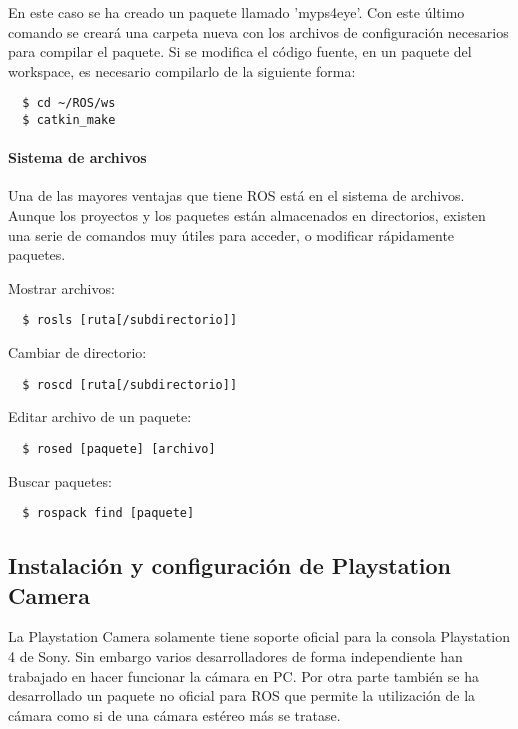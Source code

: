 En este caso se ha creado un paquete llamado 'myps4eye'. Con este último comando
se creará una carpeta nueva con los archivos de configuración necesarios para
compilar el paquete. Si se modifica el código fuente, en un paquete del
workspace, es necesario compilarlo de la siguiente forma:
\\
\begin{lstlisting}
  $ cd ~/ROS/ws
  $ catkin_make
\end{lstlisting}

\paragraph{Sistema de archivos} \hspace{0pt}

Una de las mayores ventajas que tiene ROS está en el sistema de archivos. Aunque
los proyectos y los paquetes están almacenados en directorios, existen una serie
de comandos muy útiles para acceder, o modificar rápidamente paquetes.

Mostrar archivos:
\\
\begin{lstlisting}
  $ rosls [ruta[/subdirectorio]]
\end{lstlisting}

Cambiar de directorio:
\\
\begin{lstlisting}
  $ roscd [ruta[/subdirectorio]]
\end{lstlisting}

Editar archivo de un paquete:
\\
\begin{lstlisting}
  $ rosed [paquete] [archivo]
\end{lstlisting}

Buscar paquetes:
\\
\begin{lstlisting}
  $ rospack find [paquete]
\end{lstlisting}


\subsection{Instalación y configuración de Playstation Camera}

La Playstation Camera solamente tiene soporte oficial para la consola
Playstation 4 de Sony. Sin embargo varios desarrolladores de forma independiente
han trabajado en hacer funcionar la cámara en PC. Por otra parte también se ha
desarrollado un paquete no oficial para ROS que permite la utilización de la
cámara como si de una cámara estéreo más se tratase.

